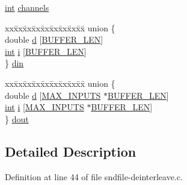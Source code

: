 \begin{DoxyCompactItemize}
\begin{tabbing}
\end{tabbing}\item 
\hyperlink{xmltok_8h_a5a0d4a5641ce434f1d23533f2b2e6653}{int} \hyperlink{struct_s_t_a_t_e_ace13238ed4ee205fca8a96a3c1aa9297}{channels}
\item 
\begin{tabbing}
xx\=xx\=xx\=xx\=xx\=xx\=xx\=xx\=xx\=\kill
union \{\\
\>double \hyperlink{struct_s_t_a_t_e_ac94f445895e6b5da656238c83324c319}{d} \mbox{[}\hyperlink{string__test_8c_a46130dc86f2322714bba26960b64e7bb}{BUFFER\_LEN}\mbox{]}\\
\>\hyperlink{xmltok_8h_a5a0d4a5641ce434f1d23533f2b2e6653}{int} \hyperlink{struct_s_t_a_t_e_ae54a2980cada12bc913f4e7490303a7d}{i} \mbox{[}\hyperlink{string__test_8c_a46130dc86f2322714bba26960b64e7bb}{BUFFER\_LEN}\mbox{]}\\
\} \hyperlink{struct_s_t_a_t_e_a7c571784adfa81442c5671f10a7f4789}{din}\\

\end{tabbing}\item 
\begin{tabbing}
xx\=xx\=xx\=xx\=xx\=xx\=xx\=xx\=xx\=\kill
union \{\\
\>double \hyperlink{struct_s_t_a_t_e_ac94f445895e6b5da656238c83324c319}{d} \mbox{[}\hyperlink{sndfile-interleave_8c_a67ea8592b7ced96ca53dec58434397e8}{MAX\_INPUTS} $\ast$\hyperlink{string__test_8c_a46130dc86f2322714bba26960b64e7bb}{BUFFER\_LEN}\mbox{]}\\
\>\hyperlink{xmltok_8h_a5a0d4a5641ce434f1d23533f2b2e6653}{int} \hyperlink{struct_s_t_a_t_e_ae54a2980cada12bc913f4e7490303a7d}{i} \mbox{[}\hyperlink{sndfile-interleave_8c_a67ea8592b7ced96ca53dec58434397e8}{MAX\_INPUTS} $\ast$\hyperlink{string__test_8c_a46130dc86f2322714bba26960b64e7bb}{BUFFER\_LEN}\mbox{]}\\
\} \hyperlink{struct_s_t_a_t_e_ae31eb8dbcd69f7d06699e044a87fb96b}{dout}\\

\end{tabbing}\end{DoxyCompactItemize}


\subsection{Detailed Description}


Definition at line 44 of file sndfile-\/deinterleave.\+c.



